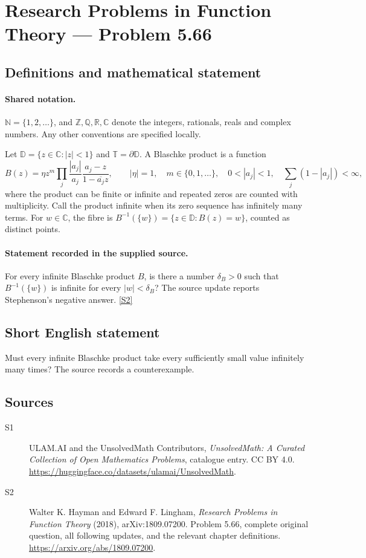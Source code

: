 \documentclass[11pt]{book}
\newcommand{\sref}[2]{\hyperlink{source:#1:#2}{[S#2]}}
\begin{document}
\section{Research Problems in Function Theory — Problem 5.66}\label{statement}

\subsection{Definitions and mathematical statement}

\paragraph{Shared notation.}$\mathbb N=\{1,2,\ldots\}$, and $\mathbb Z,\mathbb Q,\mathbb R,\mathbb C$ denote the integers, rationals, reals and complex numbers. Any other conventions are specified locally.


Let $\mathbb D=\{z\in\mathbb C:|z|<1\}$ and $\mathbb T=\partial\mathbb D$. A Blaschke product is a function \[B(z)=\eta z^m\prod_j\frac{|a_j|}{a_j}\frac{a_j-z}{1-\overline{a_j}z},\qquad |\eta|=1,\quad m\in\{0,1,\ldots\},\quad 0<|a_j|<1,\quad\sum_j(1-|a_j|)<\infty,\] where the product can be finite or infinite and repeated zeros are counted with multiplicity. Call the product infinite when its zero sequence has infinitely many terms. For $w\in\mathbb C$, the fibre is $B^{-1}(\{w\})=\{z\in\mathbb D:B(z)=w\}$, counted as distinct points.
\paragraph{Statement recorded in the supplied source.}
For every infinite Blaschke product $B$, is there a number $\delta_B>0$ such that $B^{-1}(\{w\})$ is infinite for every $|w|<\delta_B$? The source update reports Stephenson’s negative answer. \sref{statement}{2}
\subsection{Short English statement}
Must every infinite Blaschke product take every sufficiently small value infinitely many times? The source records a counterexample.
\subsection{Sources}
\begin{description}
\item[\hypertarget{source:statement:1}{S1}] ULAM.AI and the UnsolvedMath Contributors, \emph{UnsolvedMath: A Curated Collection of Open Mathematics Problems}, catalogue entry. CC BY 4.0. \url{https://huggingface.co/datasets/ulamai/UnsolvedMath}.
\item[\hypertarget{source:statement:2}{S2}] Walter K. Hayman and Edward F. Lingham, \emph{Research Problems in Function Theory} (2018), arXiv:1809.07200. Problem 5.66, complete original question, all following updates, and the relevant chapter definitions. \url{https://arxiv.org/abs/1809.07200}.
\end{description}
\label{end:statement}
\end{document}
